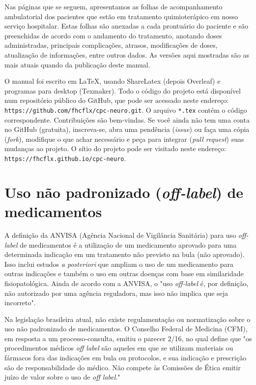 \documentclass[11pt,a4paper,oldfontcommands]{memoir}
\begin{document}
Nas páginas que se seguem, apresentamos as folhas de acompanhamento ambulatorial dos pacientes que estão em tratamento quimioterápico em nosso serviço hospitalar. Estas folhas são anexadas a cada prontuário do paciente e são preenchidas de acordo com o andamento do tratamento, anotando doses administradas, principais complicações, atrasos, modificações de doses, atualização de informações, entre outros dados. As versões aqui mostradas são as mais atuais quando da publicação deste manual.

O manual foi escrito em LaTeX, usando ShareLatex (depois Overleaf) e programas para desktop (Texmaker). Todo o código do projeto está disponível num repositório público do GitHub, que pode ser acessado neste endereço: \texttt{https://github.com/fhcflx/cpc-neuro.git}. O arquivo \texttt{*.tex} contém o código correspondente. Contribuições são bem-vindas. Se você ainda não tem uma conta no GitHub (gratuita), inscreva-se, abra uma pendência (\textit{issue}) ou faça uma cópia (\textit{fork}), modifique o que achar necessário e peça para integrar (\textit{pull request}) suas mudanças ao projeto. O sítio do projeto pode ser visitado neste endereço: \texttt{https://fhcflx.github.io/cpc-neuro}. 

\section{Uso não padronizado (\textit{off-label}) de medicamentos}

A definição da ANVISA (Agência Nacional de Vigilância Sanitária) para uso \textit{off-label} de medicamentos é a utilização de um medicamento aprovado para uma determinada indicação em um tratamento não previsto na bula (não aprovado). Isso inclui estudos \textit{a posteriori} que ampliam o uso de um medicamento para outras indicações e também o uso em outras doenças com base em similaridade fisiopatológica. Ainda de acordo com a ANVISA, o "uso \textit{off-label} é, por definição, não autorizado por uma agência reguladora, mas isso não implica que seja incorreto".

Na legislação brasileira atual, não existe regulamentação ou normatização sobre o uso não padronizado de medicamentos. O Conselho Federal de Medicina (CFM), em resposta a um processo-consulta, emitiu o parecer 2/16, no qual define que "os procedimentos médicos \textit{off label} são aqueles em que se utilizam materiais ou fármacos fora das indicações em bula ou protocolos, e sua indicação e prescrição são de responsabilidade do médico. Não compete às Comissões de Ética emitir juízo de valor sobre o uso de \textit{off label}." \cite{cfm}
\end{document}
